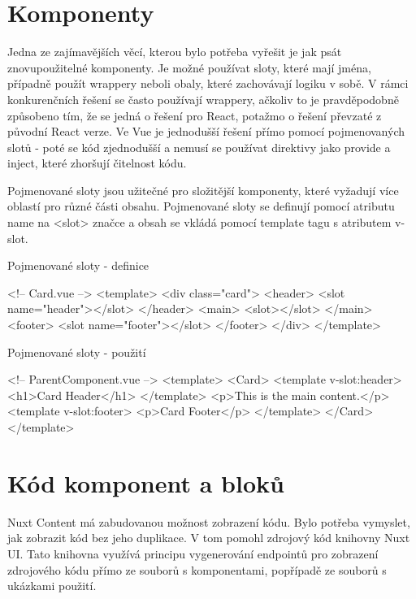 \section{Komponenty}
Jedna ze zajímavějších věcí, kterou bylo potřeba vyřešit je jak psát znovupoužitelné komponenty. Je možné používat sloty, které mají jména, případně použít wrappery neboli obaly, které zachovávají logiku v sobě. V rámci konkurenčních řešení se často používají wrappery, ačkoliv to je pravděpodobně způsobeno tím, že se jedná o řešení pro React, potažmo o řešení převzaté z původní React verze. Ve Vue je jednodušší řešení přímo pomocí pojmenovaných slotů - poté se kód zjednodušší a nemusí se používat direktivy jako provide a inject, které zhoršují čitelnost kódu.

Pojmenované sloty jsou užitečné pro složitější komponenty, které vyžadují více oblastí pro různé části obsahu. Pojmenované sloty se definují pomocí atributu name na <slot> značce a obsah se vkládá pomocí template tagu s atributem v-slot.

\begin{listing}[H]
    \caption{Pojmenované sloty - definice}
    \label{lst:named-slots}
    \begin{code}[jsx]
<!-- Card.vue -->
<template>
  <div class="card">
    <header>
      <slot name="header"></slot>
    </header>
    <main>
      <slot></slot>
    </main>
    <footer>
      <slot name="footer"></slot>
    </footer>
  </div>
</template>
    \end{code}
\end{listing}

\begin{listing}[H]
    \caption{Pojmenované sloty - použití}
    \label{lst:named-slots}
    \begin{code}[html]
<!-- ParentComponent.vue -->
<template>
    <Card>
    <template v-slot:header>
        <h1>Card Header</h1>
    </template>
    <p>This is the main content.</p>
    <template v-slot:footer>
        <p>Card Footer</p>
    </template>
    </Card>
</template>
    \end{code}
\end{listing}

\section{Kód komponent a bloků}

Nuxt Content má zabudovanou možnost zobrazení kódu. \cite{NuxtContentCodeHighlighting} Bylo potřeba vymyslet, jak zobrazit kód bez jeho duplikace. V tom pomohl zdrojový kód knihovny Nuxt UI. Tato knihovna využívá principu vygenerování endpointů pro zobrazení zdrojového kódu přímo ze souborů s komponentami, popřípadě ze souborů s ukázkami použití. \cite{NuxtUISourceCodeModule}

